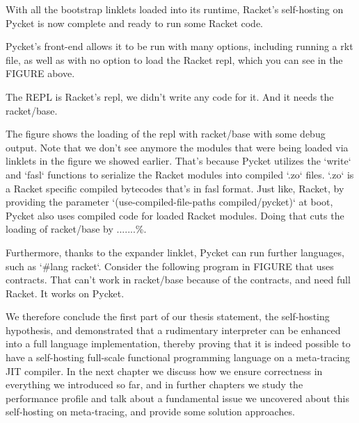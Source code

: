
		\begin{paragraph-here}%
			With all the bootstrap linklets loaded into its runtime, Racket's self-hosting on Pycket is now complete and ready to run some Racket code.
		\end{paragraph-here}

		\begin{paragraph-here}%
			Pycket's front-end allows it to be run with many options, including running a rkt file, as well as with no option to load the Racket repl, which you can see in the FIGURE above.
		\end{paragraph-here}

		\begin{paragraph-here}%
			The REPL is Racket's repl, we didn't write any code for it. And it needs the racket/base.
		\end{paragraph-here}


		\begin{paragraph-here}%
			The figure shows the loading of the repl with racket/base with some debug output. Note that we don't see anymore the modules that were being loaded via linklets in the figure we showed earlier. That's because Pycket utilizes the `write` and `fasl` functions to serialize the Racket modules into compiled `.zo` files. `.zo` is a Racket specific compiled bytecodes that's in fasl format. Just like, Racket, by providing the parameter `(use-compiled-file-paths compiled/pycket)` at boot, Pycket also uses compiled code for loaded Racket modules. Doing that cuts the loading of racket/base by .......\%.
		\end{paragraph-here}

		\begin{paragraph-here}%
			Furthermore, thanks to the expander linklet, Pycket can run further languages, such as `\#lang racket`. Consider the following program in FIGURE that uses contracts. That can't work in racket/base because of the contracts, and need full Racket. It works on Pycket.
		\end{paragraph-here}


		\begin{paragraph-here}%
			We therefore conclude the first part of our thesis statement, the self-hosting hypothesis, and demonstrated that a rudimentary interpreter can be enhanced into a full language implementation, thereby proving that it is indeed possible to have a self-hosting full-scale functional programming language on a meta-tracing JIT compiler.
			In the next chapter we discuss how we ensure correctness in everything we introduced so far, and in further chapters we study the performance profile and talk about a fundamental issue we uncovered about this self-hosting on meta-tracing, and provide some solution approaches.
		\end{paragraph-here}



